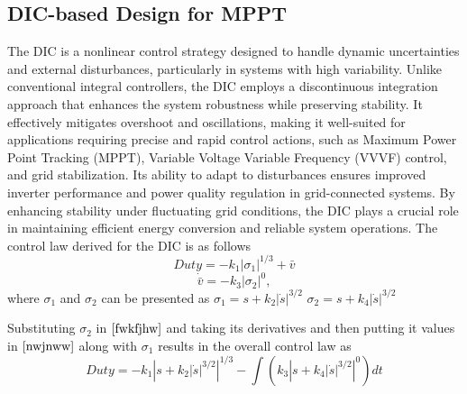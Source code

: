 \documentclass[preprint,12pt]{elsarticle}
\begin{document}
\subsection{DIC-based Design for MPPT}
\label{subsec:dic-mppt}
The DIC \cite{moreno2017discontinuous} is a nonlinear control strategy designed to handle dynamic uncertainties and external disturbances, particularly in systems with high variability. Unlike conventional integral controllers, the DIC employs a discontinuous integration approach that enhances the system robustness while preserving stability. It effectively mitigates overshoot and oscillations, making it well-suited for applications requiring precise and rapid control actions, such as Maximum Power Point Tracking (MPPT), Variable Voltage Variable Frequency (VVVF) control, and grid stabilization. Its ability to adapt to disturbances ensures improved inverter performance and power quality regulation in grid-connected systems. By enhancing stability under fluctuating grid conditions, the DIC plays a crucial role in maintaining efficient energy conversion and reliable system operations.
The control law derived for the DIC is as follows
\begin{equation}\label{nwjnww}
    Duty=-k_1 \left| \sigma_1 \right|^{1/3} + \bar{v}
\end{equation}
\begin{equation}\label{fwkfjhw}
    \dot{\bar{v}} = -k_3 \left| \sigma_2 \right|^0,
\end{equation}
where \(\sigma_1\) and \(\sigma_2\) can be presented as
\(\sigma_1=s+k_2 \left|\dot{s} \right|^{3/2}\)
\(\sigma_2=s+k_4 \left|\dot{s} \right|^{3/2}\)

Substituting $\sigma_2$ in $\ref{fwkfjhw}$ and taking its derivatives and then putting it values in $\ref{nwjnww}$ along with $\sigma_1$ results in the overall control law as
\begin{equation}
    Duty = -k_1 \left| s + k_2 \left| \dot{s} \right|^{3/2} \right|^{1/3} - \int \left( k_3 \left| s + k_4 \left| \dot{s} \right|^{3/2} \right|^0 \right) dt
\end{equation}
\end{document}
